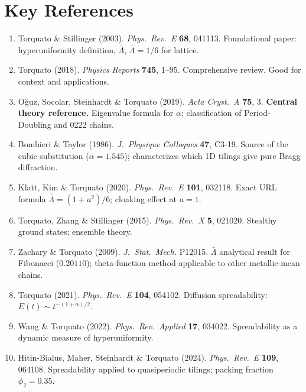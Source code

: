 \documentclass[11pt,letterpaper]{article}
\begin{document}
\section{Key References}

\begin{enumerate}[leftmargin=2em]
  \item Torquato \& Stillinger (2003). \textit{Phys.\ Rev.\ E} \textbf{68}, 041113.
    Foundational paper: hyperuniformity definition, $\bar\Lambda$, $\bar\Lambda=1/6$ for lattice.

  \item Torquato (2018). \textit{Physics Reports} \textbf{745}, 1--95.
    Comprehensive review. Good for context and applications.

  \item Oğuz, Socolar, Steinhardt \& Torquato (2019). \textit{Acta Cryst.\ A} \textbf{75}, 3.
    \textbf{Central theory reference.} Eigenvalue formula for $\alpha$;
    classification of Period-Doubling and 0222 chains.

  \item Bombieri \& Taylor (1986). \textit{J.\ Physique Colloques} \textbf{47}, C3-19.
    Source of the cubic substitution ($\alpha=1.545$); characterizes which 1D
    tilings give pure Bragg diffraction.

  \item Klatt, Kim \& Torquato (2020). \textit{Phys.\ Rev.\ E} \textbf{101}, 032118.
    Exact URL formula $\bar\Lambda=(1+a^2)/6$; cloaking effect at $a=1$.

  \item Torquato, Zhang \& Stillinger (2015). \textit{Phys.\ Rev.\ X} \textbf{5}, 021020.
    Stealthy ground states; ensemble theory.

  \item Zachary \& Torquato (2009). \textit{J.\ Stat.\ Mech.} P12015.
    $\bar\Lambda$ analytical result for Fibonacci ($0.20110$); theta-function method
    applicable to other metallic-mean chains.

  \item Torquato (2021). \textit{Phys.\ Rev.\ E} \textbf{104}, 054102.
    Diffusion spreadability: $E(t)\sim t^{-(1+\alpha)/2}$.

  \item Wang \& Torquato (2022). \textit{Phys.\ Rev.\ Applied} \textbf{17}, 034022.
    Spreadability as a dynamic measure of hyperuniformity.

  \item Hitin-Bialus, Maher, Steinhardt \& Torquato (2024). \textit{Phys.\ Rev.\ E} \textbf{109}, 064108.
    Spreadability applied to quasiperiodic tilings; packing fraction $\phi_2=0.35$.
\end{enumerate}
\end{document}
